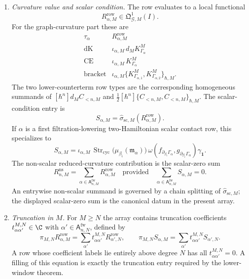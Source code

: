 \begin{defn}
\begin{enumerate}[label=(A\arabic*)]
    \item \emph{Curvature value and scalar condition.}  The row evaluates to a
    local functional
    \[
      R_{\alpha,M}^{\mathrm{row}}\in\mathfrak Q^1_{\mathcal G,M}(I).
    \]
    For the graph-curvature part these are
    \[
    \begin{array}{c|c}
      \tau_\alpha & R_{\alpha,M}^{\mathrm{row}} \\ \hline
      \mathrm{dK} & \iota_{\alpha,M}\,d_MK^M_{\Gamma_\alpha}\\
      \mathrm{CE} & \iota_{\alpha,M}\,K^M_{\Gamma_\alpha}\\
      \mathrm{bracket} &
        \iota_{\alpha,M}\{K^M_{\Gamma_{\alpha,1}},
        K^M_{\Gamma_{\alpha,2}}\}_{\hbar,M}.
    \end{array}
    \]
    The two lower-counterterm row types are the corresponding homogeneous
    summands of
    \([\hbar^n]d_MC_{<n,M}\) and
    \(\frac12[\hbar^n]\{C_{<n,M},C_{<n,M}\}_{\hbar,M}\).
    The scalar-condition entry is
    \[
      S_{\alpha,M}=
      \widehat\sigma_{\mathrm{sc},M}(R_{\alpha,M}^{\mathrm{row}}).
    \]
    If \(\alpha\) is a first filtration-lowering two-Hamiltonian scalar
    contact row, this specializes to
    \[
      S_{\alpha,M}=
      \iota_{\alpha,M}\,
      \operatorname{Str}_{\mathrm{cyc}}
        \bigl(\mu_{\beta_i}(\mathfrak m_\alpha)\bigr)\,
      \omega(f_{\partial_{\beta_i}\Gamma_\alpha},
             g_{\partial_{\beta_i}\Gamma_\alpha})
      \gamma_{\mathbf 1}.
    \]
    The non-scalar reduced-curvature contribution is the scalar-zero sum
    \[
      R^{\mathrm{ns}}_{n,M}
        =
      \sum_{\alpha\in\mathsf A^{\mathrm{fw}}_{n,M}}
        R_{\alpha,M}^{\mathrm{row}}
      \quad\text{provided}\quad
      \sum_{\alpha\in\mathsf A^{\mathrm{fw}}_{n,M}}S_{\alpha,M}=0.
    \]
    An entrywise non-scalar summand is governed by a chain
    splitting of \(\widehat\sigma_{\mathrm{sc},M}\); the displayed
    scalar-zero sum is the canonical datum in the present array.

    \item \emph{Truncation in \(M\).}  For \(M\geq N\) the array contains
    truncation coefficients \(t^{M,N}_{\alpha\alpha'}\in\C\) with
    \(\alpha'\in\mathsf A^{\mathrm{fw}}_{n,N}\), defined by
    \[
      \pi_{M,N}R^{\mathrm{row}}_{\alpha,M}
        =
      \sum_{\alpha'}t^{M,N}_{\alpha\alpha'}R^{\mathrm{row}}_{\alpha',N},
      \qquad
      \pi_{M,N}S_{\alpha,M}
        =
      \sum_{\alpha'}t^{M,N}_{\alpha\alpha'}S_{\alpha',N}.
    \]
    A row whose coefficient labels lie entirely above degree \(N\) has
    all \(t^{M,N}_{\alpha\alpha'}=0\).  A filling of this equation is
    exactly the truncation entry required by the lower-window theorem.


\end{enumerate}
\end{defn}
